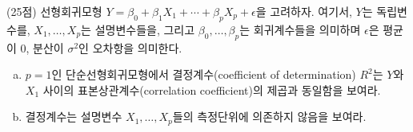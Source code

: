 \documentclass[answers]{exam}
\begin{document}
\begin{questions}
\begin{solution}
    \end{solution}
    \question
    (25점) 선형회귀모형 $Y=\beta_{0}+\beta_{1}X_{1}+\cdots+\beta_{p}X_{p}+\epsilon$을 고려하자. 여기서, $Y$는 독립변수를, $X_{1},\ldots,X_{p}$는 설명변수들을, 그리고 $\beta_{0},\ldots, \beta_{p}$는 회귀계수들을 의미하며 $\epsilon$은 평균이 $0$, 분산이 $\sigma^{2}$인 오차항을 의미한다.
    \begin{enumerate}[(a)]
      \item $p=1$인 단순선형회귀모형에서 결정계수(coefficient of determination) $R^{2}$는 $Y$와 $X_{1}$ 사이의 표본상관계수(correlation coefficient)의 제곱과 동일함을 보여라.
      \item 결정계수는 설명변수 $X_{1},\ldots,X_{p}$들의 측정단위에 의존하지 않음을 보여라.
    \end{enumerate}
    \begin{solution}

    \end{solution}
\end{questions}
\end{document}
